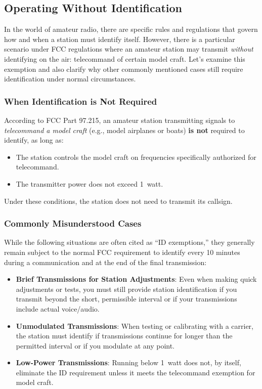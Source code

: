 \subsection{Operating Without Identification}
\label{subsec:operating-no-id}

In the world of amateur radio, there are specific rules and regulations that govern how and when a station must identify itself. However, there is a particular scenario under FCC regulations where an amateur station may transmit \emph{without} identifying on the air: telecommand of certain model craft. Let's examine this exemption and also clarify why other commonly mentioned cases still require identification under normal circumstances.

\subsubsection*{When Identification is Not Required}
According to FCC Part 97.215, an amateur station transmitting signals to \emph{telecommand a model craft} (e.g., model airplanes or boats) \textbf{is not} required to identify, as long as:
\begin{itemize}
    \item The station controls the model craft on frequencies specifically authorized for telecommand.
    \item The transmitter power does not exceed 1~watt.
\end{itemize}
Under these conditions, the station does not need to transmit its callsign.

\subsubsection*{Commonly Misunderstood Cases}
While the following situations are often cited as ``ID exemptions,'' they generally remain subject to the normal FCC requirement to identify every 10 minutes during a communication and at the end of the final transmission:

\begin{itemize}
    \item \textbf{Brief Transmissions for Station Adjustments}: Even when making quick adjustments or tests, you must still provide station identification if you transmit beyond the short, permissible interval or if your transmissions include actual voice/audio.  
    \item \textbf{Unmodulated Transmissions}: When testing or calibrating with a carrier, the station must identify if transmissions continue for longer than the permitted interval or if you modulate at any point.  
    \item \textbf{Low-Power Transmissions}: Running below 1~watt does not, by itself, eliminate the ID requirement unless it meets the telecommand exemption for model craft.
\end{itemize}


